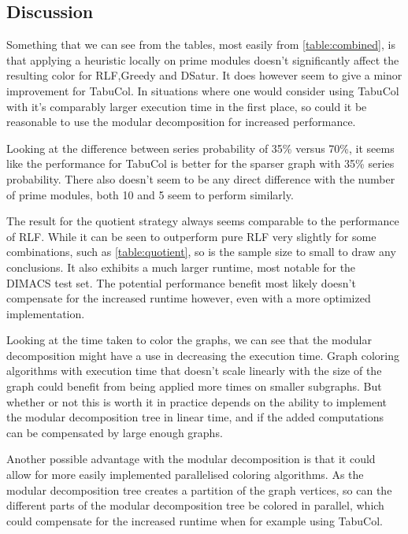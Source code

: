 \documentclass[a4paper]{article}
\begin{document}
\FloatBarrier
\subsection{Discussion}

Something that we can see from the tables, most easily from
\autoref{table:combined}, is that applying a heuristic locally on prime modules
doesn't significantly affect the resulting color for RLF,Greedy and DSatur. It
does however seem to give a minor improvement for TabuCol. In situations where
one would consider using TabuCol with it's comparably larger execution time in
the first place, so could it be reasonable to use the modular decomposition for
increased performance.

Looking at the difference between series probability of 35\% versus 70\%, it
seems like the performance for TabuCol is better for the sparser graph with
35\% series probability. There also doesn't seem to be any direct difference
with the number of prime modules, both 10 and 5 seem to perform similarly.

The result for the quotient strategy always seems comparable to the performance
of RLF. While it can be seen to outperform pure RLF very slightly for some combinations,
such as \autoref{table:quotient}, 
so is the sample size to small to draw any conclusions. 
It also exhibits a much larger runtime, most notable for the DIMACS test set.
The potential performance benefit most likely doesn't compensate for the
increased runtime however, even with a more optimized implementation.


Looking at the time taken to color the graphs, we can see that the modular decomposition might have a 
use in decreasing the execution time. Graph coloring algorithms with execution time that
doesn't scale linearly with the size of the graph could benefit from being applied
more times on smaller subgraphs. But whether or not this is worth it in practice 
depends on the ability to implement the modular decomposition tree in linear time, 
and if the added computations can be compensated by large enough graphs.

Another possible advantage with the modular decomposition is that it could
allow for more easily implemented parallelised coloring algorithms. As the
modular decomposition tree creates a partition of the graph vertices, so can
the different parts of the modular decomposition tree be colored in parallel,
which could compensate for the increased runtime when for example using TabuCol.
\end{document}
